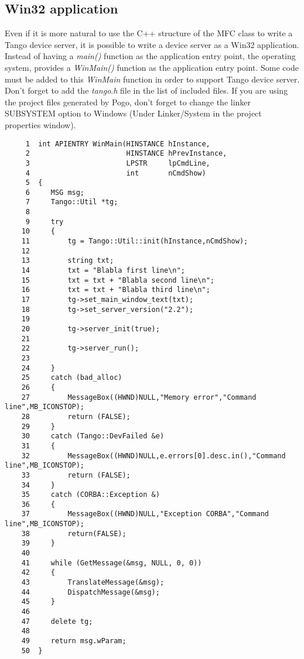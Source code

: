 \subsection{Win32 application}

Even if it is more natural to use the C++ structure of the MFC class
to write a Tango device server, it is possible to write a device server
as a Win32 application. Instead of having a \emph{main()}
function as the application entry point, the operating system, provides
a \emph{WinMain()} function as the application entry point. Some code
must be added to this \emph{WinMain} function in order
to support Tango device server. Don't forget to add the \emph{tango}.\emph{h}
file in the list of included files. If you are using the project files
generated by Pogo, don't forget to change the linker SUBSYSTEM option
to \textquotedbl{}Windows\textquotedbl{} (Under Linker/System in the
project properties window).


\begin{verbatim}
     1  int APIENTRY WinMain(HINSTANCE hInstance,
     2                       HINSTANCE hPrevInstance,
     3                       LPSTR     lpCmdLine,
     4                       int       nCmdShow)
     5  {
     6     MSG msg;
     7     Tango::Util *tg;
     8  
     9     try
    10     {
    11         tg = Tango::Util::init(hInstance,nCmdShow);
    12  
    13         string txt;
    14         txt = "Blabla first line\n";
    15         txt = txt + "Blabla second line\n";
    16         txt = txt + "Blabla third line\n";
    17         tg->set_main_window_text(txt);
    18         tg->set_server_version("2.2");
    19  
    20         tg->server_init(true);
    21  
    22         tg->server_run();
    23  
    24     }
    25     catch (bad_alloc)
    26     {
    27         MessageBox((HWND)NULL,"Memory error","Command line",MB_ICONSTOP);
    28         return (FALSE);
    29     }
    30     catch (Tango::DevFailed &e)
    31     {
    32         MessageBox((HWND)NULL,e.errors[0].desc.in(),"Command line",MB_ICONSTOP);
    33         return (FALSE);
    34     }
    35     catch (CORBA::Exception &)
    36     {
    37         MessageBox((HWND)NULL,"Exception CORBA","Command line",MB_ICONSTOP);
    38         return(FALSE);
    39     }
    40  
    41     while (GetMessage(&msg, NULL, 0, 0)) 
    42     {
    43         TranslateMessage(&msg);
    44         DispatchMessage(&msg);
    45     }
    46  
    47     delete tg;
    48  
    49     return msg.wParam;
    50  }
\end{verbatim}


